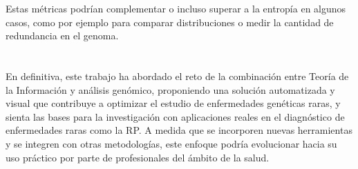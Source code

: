 \documentclass[11pt,spanish,listoffigures,listoftables]{tfgetsinf}
\begin{document}
Estas métricas podrían complementar o incluso superar a la entropía en algunos casos, como por ejemplo para comparar distribuciones o medir la cantidad de redundancia en el genoma.\\\\\\

En definitiva, este trabajo ha abordado el reto de la combinación entre Teoría de la Información y análisis genómico, proponiendo una solución automatizada y visual que contribuye a optimizar el estudio de enfermedades genéticas raras, y sienta las bases para la investigación con aplicaciones reales en el diagnóstico de enfermedades raras como la \ac{RP}. A medida que se incorporen nuevas herramientas y se integren con otras metodologías, este enfoque podría evolucionar hacia su uso práctico por parte de profesionales del ámbito de la salud.




\end{document}
